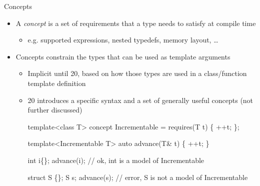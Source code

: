 \begin{frame}[fragile]{Concepts}

  \begin{itemize}
  \item A \textit{concept} is a set of requirements that a type needs to satisfy
    at compile time
    \begin{itemize}
    \item e.g. supported expressions, nested typedefs, memory layout, \ldots
    \end{itemize}

  \item<2-> Concepts constrain the types that can be used as template arguments
    \begin{itemize}
    \item Implicit until \Cpp{}20, based on how those types are used in a
      class/function template definition

    \item<3-> \Cpp{}20 introduces a specific syntax and a set of generally useful
      concepts (not further discussed)
      \begin{codeblock}
template<class T>
concept Incrementable = requires(T t) \{ ++t; \};

template<Incrementable T>
auto advance(T& t) \{ ++t; \}

int i\{\};
advance(i); // ok, int is a model of Incrementable

struct S \{\};
S s;
advance(s); // error, S is not a model of Incrementable\end{codeblock}
    \end{itemize}
  \end{itemize}

\end{frame}

